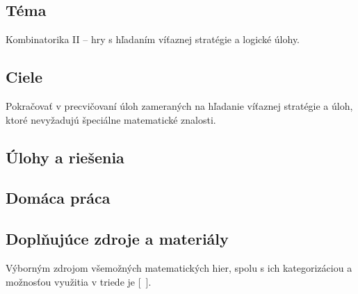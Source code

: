 

\subsection*{Téma}
Kombinatorika II -- hry s hľadaním víťaznej stratégie a logické úlohy.
\subsection*{Ciele}
Pokračovať v precvičovaní úloh zameraných na hľadanie víťaznej stratégie a úloh, ktoré nevyžadujú špeciálne matematické znalosti.

\subsection*{Úlohy a riešenia}













\subsection*{Domáca práca}







\subsection*{Doplňujúce zdroje a materiály}
Výborným zdrojom všemožných matematických hier, spolu s ich kategorizáciou a možnosťou využitia v triede je  [~\cite{burjan1999}].


